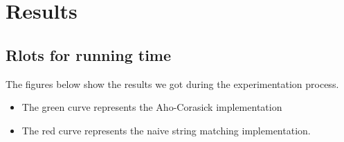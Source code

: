 \documentclass[12pt]{article}
\begin{document}
	\section{Results}
		\subsection{Rlots for running time }
			
			The figures below show the results we got during the experimentation process. 
			\begin{itemize}
				\item The green curve represents the Aho-Corasick implementation
				\item The red curve represents the naive string matching implementation. 
			\end{itemize}
			\begin{figure}[H]
				\hfill
				\hfill
			\end{figure}
\end{document}
